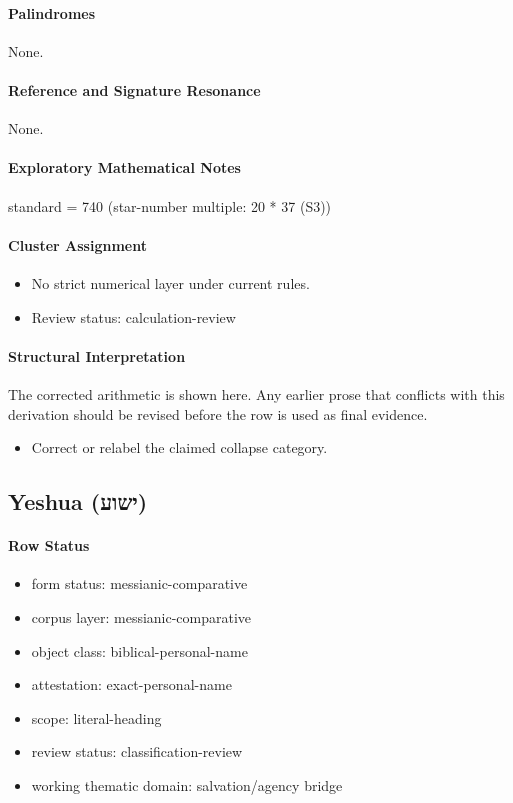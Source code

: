 \paragraph{Palindromes}
None.
\paragraph{Reference and Signature Resonance}
None.
\paragraph{Exploratory Mathematical Notes}
standard = 740 (star-number multiple: 20 * 37 (S3))
\paragraph{Cluster Assignment}
\begin{itemize}
\item No strict numerical layer under current rules.
\item Review status: calculation-review
\end{itemize}
\paragraph{Structural Interpretation}
The corrected arithmetic is shown here. Any earlier prose that conflicts with this derivation should be revised before the row is used as final evidence.

\begin{itemize}
\item Correct or relabel the claimed collapse category.
\end{itemize}

\subsection{Yeshua (ישוע)}
\paragraph{Row Status}
\begin{itemize}
\item form status: messianic-comparative
\item corpus layer: messianic-comparative
\item object class: biblical-personal-name
\item attestation: exact-personal-name
\item scope: literal-heading
\item review status: classification-review
\item working thematic domain: salvation/agency bridge
\end{itemize}
